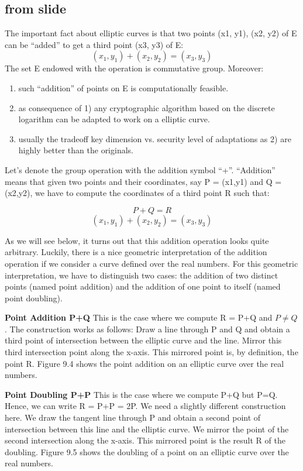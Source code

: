 \documentclass{article}
\begin{document}
 \begin{mdframed}
\section{from slide}
The important fact about elliptic curves is that two points (x1, y1), (x2, y2) of E can be
“added” to get a third point (x3, y3) of E: 
$$ { (x_1, y_1) + (x_2,y_2) = (x_3, y_3)}$$ 
The set E endowed with the operation is commutative group. Moreover:
\begin{enumerate}
    \item such “addition” of points on E is computationally feasible.
    \item as consequence of 1) any cryptographic algorithm based on the discrete logarithm can be
adapted to work on a elliptic curve.
    \item usually the tradeoff key dimension vs. security level of adaptations as 2) are highly better
than the originals.
\end{enumerate}
\end{mdframed}

Let’s denote the group operation with the addition symbol “+”. “Addition” means
that given two points and their coordinates, say P = (x1,y1) and Q = (x2,y2), we
have to compute the coordinates of a third point R such that: 

$$ { P + Q = R}$$
$$ { (x_1, y_1) + (x_2,y_2) = (x_3, y_3)}$$ 

As we will see below, it turns out that this addition operation looks quite arbitrary.
Luckily, there is a nice geometric interpretation of the addition operation if we
consider a curve defined over the real numbers. For this geometric interpretation,
we have to distinguish two cases: the addition of two distinct points (named point
addition) and the addition of one point to itself (named point doubling).

\textbf{Point Addition P+Q} This is the case where we compute R = P+Q and ${P \ne Q}$. The construction works as follows: Draw a line through P and Q and obtain a
third point of intersection between the elliptic curve and the line. Mirror this third
intersection point along the x-axis. This mirrored point is, by definition, the point R.
Figure 9.4 shows the point addition on an elliptic curve over the real numbers.

\textbf{Point Doubling P+P} This is the case where we compute P+Q but P=Q. Hence,
we can write R = P+P = 2P. We need a slightly different construction here. We draw the tangent line through P and obtain a second point of intersection between
this line and the elliptic curve. We mirror the point of the second intersection along
the x-axis. This mirrored point is the result R of the doubling. Figure 9.5 shows the doubling of a point on an elliptic curve over the real numbers. \\
\end{document}
